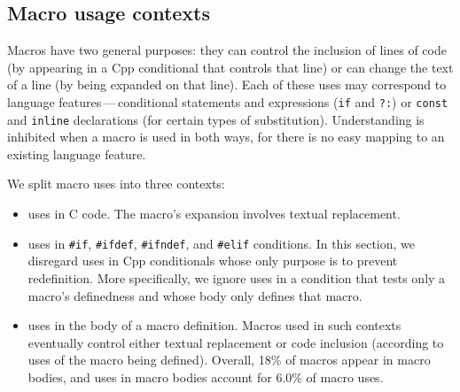 \documentclass[10pt]{article}
\newcommand{\pkg}[1]{\textsf{#1}}
\begin{document}






\subsection{Macro usage contexts}
\label{sec:inconsistent-usage}

Macros have two general purposes: they can control the inclusion of lines
of code (by appearing in a Cpp conditional that controls that line) or can
change the text of a line (by being expanded on that line).  Each of these
uses may correspond to language features\,---\,conditional statements and
expressions (\texttt{if} and {\tt ?:}) or {\tt const} and {\tt inline}
declarations (for certain types of substitution).  Understanding is
inhibited when a macro is used in both ways, for there is no easy mapping
to an existing language feature.


We split macro uses into three contexts:
\begin{itemize}\itemsep 0pt \parskip 0pt
\item uses in C code.   The macro's expansion involves textual
      replacement.
\item uses in \texttt{\#if}, \texttt{\#ifdef}, \texttt{\#ifndef}, and
  \texttt{\#elif} conditions.  In this section, we disregard uses in Cpp
  conditionals whose only purpose is to prevent redefinition.  More
  specifically, we ignore uses in a condition that tests only a macro's
  definedness and whose body only defines that macro.
\item uses in the body of a macro definition.
  Macros used in such contexts eventually control either textual
  replacement or code inclusion (according to uses of the macro being
  defined).  Overall, 18\% of macros appear in macro bodies, and uses in
  macro bodies account for 6.0\% of macro uses.
\end{itemize}
\end{document}
